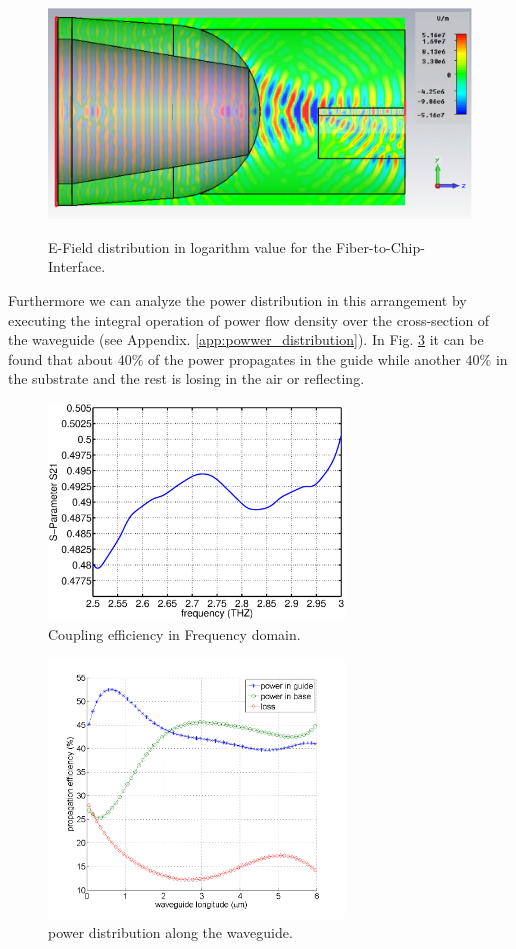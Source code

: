 \begin{figure}[!ht]
\centering
	\includegraphics[width=0.7 \textwidth]{bilder/cst_basic_waveguide_efield}
	\label{fig:coupling_e_field}
	\caption{E-Field distribution in logarithm value for the Fiber-to-Chip-Interface.}
\end{figure}
Furthermore we can analyze the power distribution in this arrangement by executing the integral operation of power flow density over the cross-section of the waveguide (see Appendix. \ref{app:powwer_distribution}).  In Fig. \ref{fig:power_distribution} it can be found that about $40\%$ of the power propagates in the guide while another $40\%$ in the substrate and the rest is losing in the air or reflecting.
\begin{figure}
\centering
\includegraphics[width=0.7\textwidth]{bilder/original_coupling_efficiency}
\caption{Coupling efficiency in Frequency domain.}
\label{fig:orignial_coupling_efficiency}
\end{figure}
\begin{figure}[!ht]
\centering
\includegraphics[width=0.7\textwidth]{bilder/power_distribution1}
\caption{power distribution along the waveguide.}
\label{fig:power_distribution}
\end{figure}
